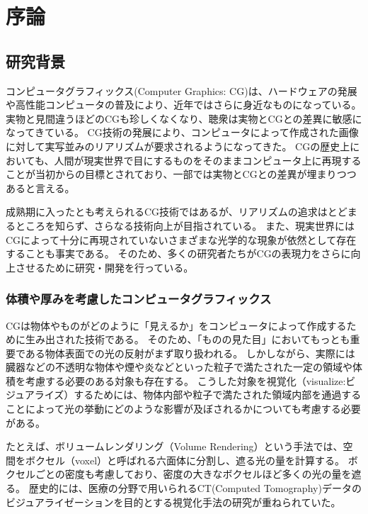 \chapter{序論}
\label{CBegin}

\section{研究背景}
\label{SBackground}

コンピュータグラフィックス(Computer Graphics: CG)は、ハードウェアの発展や高性能コンピュータの普及により、近年ではさらに身近なものになっている。
実物と見間違うほどのCGも珍しくなくなり、聴衆は実物とCGとの差異に敏感になってきている。
CG技術の発展により、コンピュータによって作成された画像に対して実写並みのリアリズムが要求されるようになってきた。
CGの歴史上においても、人間が現実世界で目にするものをそのままコンピュータ上に再現することが当初からの目標とされており、一部では実物とCGとの差異が埋まりつつあると言える。

成熟期に入ったとも考えられるCG技術ではあるが、リアリズムの追求はとどまるところを知らず、さらなる技術向上が目指されている。
また、現実世界にはCGによって十分に再現されていないさまざまな光学的な現象が依然として存在することも事実である。
そのため、多くの研究者たちがCGの表現力をさらに向上させるために研究・開発を行っている。


\subsection{体積や厚みを考慮したコンピュータグラフィックス}
\label{SSVolumerendering}

CGは物体やものがどのように「見えるか」をコンピュータによって作成するために生み出された技術である。
そのため、「ものの見た目」においてもっとも重要である物体表面での光の反射がまず取り扱われる。
しかしながら、実際には臓器などの不透明な物体や煙や炎などといった粒子で満たされた一定の領域や体積を考慮する必要のある対象も存在する。
こうした対象を視覚化（visualize:ビジュアライズ）するためには、物体内部や粒子で満たされた領域内部を通過することによって光の挙動にどのような影響が及ぼされるかについても考慮する必要がある。

たとえば、ボリュームレンダリング（Volume Rendering）という手法では、空間をボクセル（voxel）と呼ばれる六面体に分割し、遮る光の量を計算する。
ボクセルごとの密度も考慮しており、密度の大きなボクセルほど多くの光の量を遮る。
歴史的には、医療の分野で用いられるCT(Computed Tomography)データのビジュアライゼーションを目的とする視覚化手法の研究が重ねられていた。


